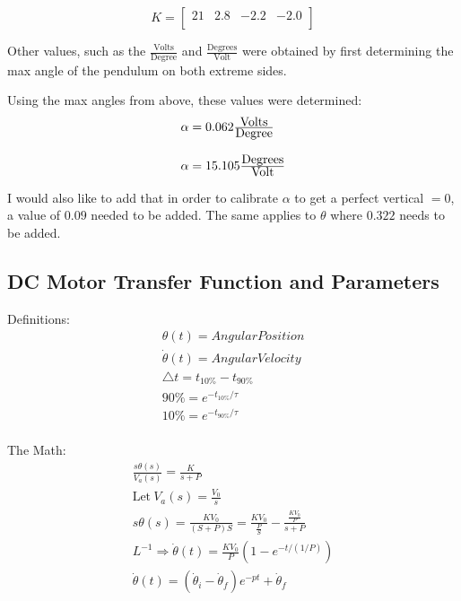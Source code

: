 \documentclass[aps,letterpaper,10pt]{revtex4}
\begin{document}
	\[
	K  =
	\begin{bmatrix}
	21 & 2.8 & -2.2 & -2.0 \\
	\end{bmatrix}
	\]

Other values, such as the $\frac{\mbox{Volts}}{\mbox{Degree}}$ and $\frac{\mbox{Degrees}}{\mbox{Volt}}$ were obtained by first determining the max angle of the pendulum on both extreme sides.

Using the max angles from above, these values were determined:
	\[
	\begin{array}{l l}
		\alpha = 0.062 \frac{\mbox{Volts}}{\mbox{Degree}} \\ \\
		\alpha = 15.105 \frac{\mbox{Degrees}}{\mbox{Volt}} \\
	\end{array}
	\]

I would also like to add that in order to calibrate $\alpha$ to get a perfect vertical $= 0$, a value of $0.09$ needed to be added.  The same applies to $\theta$ where $0.322$ needs to be added.

\subsection{DC Motor Transfer Function and Parameters}

Definitions:
	\begin{align*}
		\theta(t) =  Angular Position \\
		\dot{\theta}(t) =  Angular Velocity \\
		\triangle t = t_{10\%} - t_{90\%} \\
		90\% = e^{-t_{10\%}/\tau} \\
		10\% = e^{-t_{90\%}/\tau} \\
	\end{align*}

The Math:
	\begin{align*}
		\frac{s\theta(s)}{V_{a}(s)} = \frac{K}{s+P} \\
		\mbox{Let}\ V_{a}(s) = \frac{V_{0}}{s} \\  %
		s\theta(s) = \frac{KV_{0}}{(S+P)S} = \frac{KV_{0}}{\frac{P}{S}} - \frac{\frac{KV_{0}}{P}}{s+P} \\
		L^{-1} \Rightarrow \dot{\theta}(t) = \frac{KV_{0}}{P}(1-e^{-t/(1/P)}) \\
		\dot{\theta}(t) = (\dot{\theta}_{i} - \dot{\theta}_{f})e^{-pt} + \dot{\theta}_{f} \\
	\end{align*}
\end{document}
